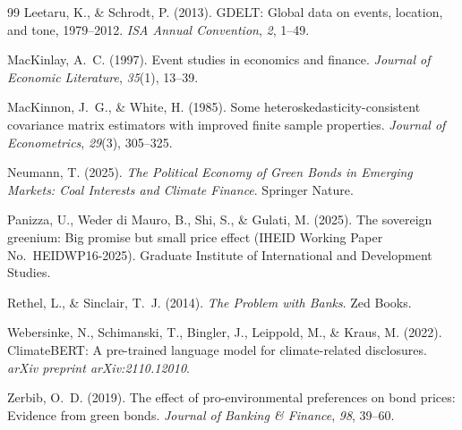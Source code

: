 \documentclass[12pt,a4paper]{article}
\begin{document}
\begin{thebibliography}{99}
Leetaru, K., \& Schrodt, P. (2013).
GDELT: Global data on events, location, and tone, 1979--2012.
\textit{ISA Annual Convention}, \textit{2}, 1--49.

MacKinlay, A.~C. (1997).
Event studies in economics and finance.
\textit{Journal of Economic Literature}, \textit{35}(1), 13--39.

MacKinnon, J.~G., \& White, H. (1985).
Some heteroskedasticity-consistent covariance matrix estimators with improved finite sample properties.
\textit{Journal of Econometrics}, \textit{29}(3), 305--325.

Neumann, T. (2025).
\textit{The Political Economy of Green Bonds in Emerging Markets: Coal Interests and Climate Finance}.
Springer Nature.

Panizza, U., Weder di Mauro, B., Shi, S., \& Gulati, M. (2025).
The sovereign greenium: Big promise but small price effect
(IHEID Working Paper No.\ HEIDWP16-2025).
Graduate Institute of International and Development Studies.

Rethel, L., \& Sinclair, T.~J. (2014).
\textit{The Problem with Banks}.
Zed Books.

Webersinke, N., Schimanski, T., Bingler, J., Leippold, M., \& Kraus, M. (2022).
ClimateBERT: A pre-trained language model for climate-related disclosures.
\textit{arXiv preprint arXiv:2110.12010}.

Zerbib, O.~D. (2019).
The effect of pro-environmental preferences on bond prices: Evidence from green bonds.
\textit{Journal of Banking \& Finance}, \textit{98}, 39--60.

\end{thebibliography}
\end{document}
